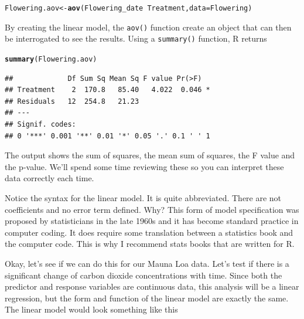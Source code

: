 \documentclass{tufte-handout}\usepackage[]{graphicx}\usepackage[]{color}
\makeatletter
\newcommand{\hlopt}[1]{\textcolor[rgb]{0,0,0}{#1}}%
\newcommand{\hlstd}[1]{\textcolor[rgb]{0.345,0.345,0.345}{#1}}%
\newcommand{\hlkwb}[1]{\textcolor[rgb]{0.69,0.353,0.396}{#1}}%
\newcommand{\hlkwc}[1]{\textcolor[rgb]{0.333,0.667,0.333}{#1}}%
\newcommand{\hlkwd}[1]{\textcolor[rgb]{0.737,0.353,0.396}{\textbf{#1}}}%
\newenvironment{kframe}{%
 \def\at@end@of@kframe{}%
 \ifinner\ifhmode%
  \def\at@end@of@kframe{\end{minipage}}%
  \begin{minipage}{\columnwidth}%
 \fi\fi%
 \def\FrameCommand##1{\hskip\@totalleftmargin \hskip-\fboxsep
 \colorbox{shadecolor}{##1}\hskip-\fboxsep
     \hskip-\linewidth \hskip-\@totalleftmargin \hskip\columnwidth}%
 \MakeFramed {\advance\hsize-\width
   \@totalleftmargin\z@ \linewidth\hsize
   \@setminipage}}%
 {\par\unskip\endMakeFramed%
 \at@end@of@kframe}
\newenvironment{knitrout}{}{} %
\makeatother
\begin{document}
\begin{knitrout}
\color{fgcolor}\begin{kframe}
\begin{alltt}
\hlstd{Flowering.aov} \hlkwb{<-} \hlkwd{aov}\hlstd{(Flowering_date} \hlopt{~} \hlstd{Treatment,} \hlkwc{data}\hlstd{=Flowering)}
\end{alltt}
\end{kframe}
\end{knitrout}

By creating the linear model, the \texttt{aov()} function create an object that can then be interrogated to see the results. Using a \texttt{summary()} function, R returns

\begin{knitrout}
\color{fgcolor}\begin{kframe}
\begin{alltt}
\hlkwd{summary}\hlstd{(Flowering.aov)}
\end{alltt}
\begin{verbatim}
##             Df Sum Sq Mean Sq F value Pr(>F)  
## Treatment    2  170.8   85.40   4.022  0.046 *
## Residuals   12  254.8   21.23                 
## ---
## Signif. codes:  
## 0 '***' 0.001 '**' 0.01 '*' 0.05 '.' 0.1 ' ' 1
\end{verbatim}
\end{kframe}
\end{knitrout}

The output shows the sum of squares, the mean sum of squares, the F value and the p-value. We'll spend some time reviewing these so you can interpret these data correctly each time.

Notice the syntax for the linear model. It is quite abbreviated. There are not coefficients and no error term defined. Why?  This form of model specification was proposed by statisticians in the late 1960s and it has become standard practice in computer coding. It does require some translation between a statistics book and the computer code. This is why I recommend stats books that are written for R.  

Okay, let's see if we can do this for our Mauna Loa data. Let's test if there is a significant change of carbon dioxide concentrations with time. Since both the predictor and response variables are continuous data, this analysis will be a linear regression, but the form and function of the linear model are exactly the same. The linear model would look something like this
\end{document}
